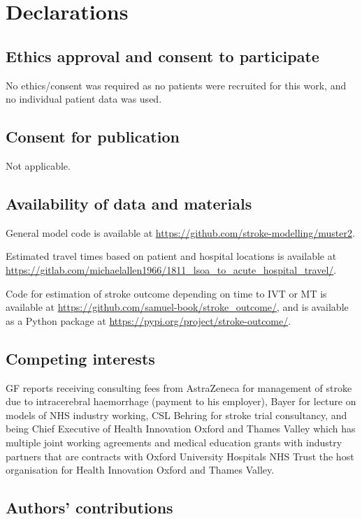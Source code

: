 \section{Declarations}

\subsection{Ethics approval and consent to participate}

No ethics/consent was required as no patients were recruited for this work, and no individual patient data was used.

\subsection{Consent for publication}

Not applicable.

\subsection{Availability of data and materials}

General model code is available at \url{https://github.com/stroke-modelling/muster2}.

Estimated travel times based on patient and hospital locations is available at \url{https://gitlab.com/michaelallen1966/1811_lsoa_to_acute_hospital_travel/}.

Code for estimation of stroke outcome depending on time to IVT or MT is available at \url{https://github.com/samuel-book/stroke_outcome/}, and is available as a Python package at \url{https://pypi.org/project/stroke-outcome/}.

\subsection*{Competing interests}

GF reports receiving consulting fees from AstraZeneca for management of stroke due to intracerebral haemorrhage (payment to his employer), Bayer for lecture on models of NHS industry working, CSL Behring for stroke trial consultancy, and being Chief Executive of Health Innovation Oxford and Thames Valley which has multiple joint working agreements and medical education grants with industry partners that are contracts with Oxford University Hospitals NHS Trust the host organisation for Health Innovation Oxford and Thames Valley.

\subsection{Authors' contributions}


